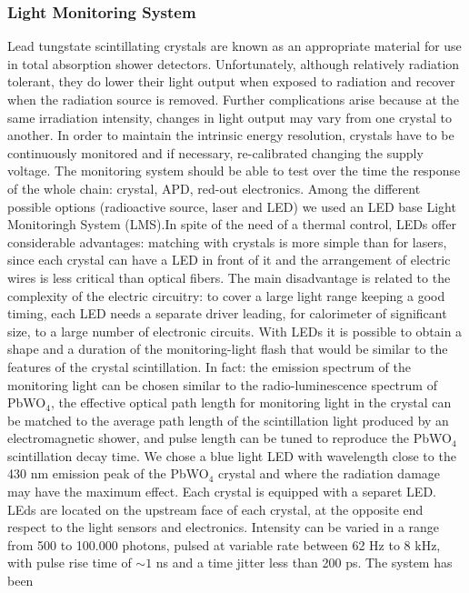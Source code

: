 \subsubsection{Light Monitoring System}
Lead tungstate scintillating crystals are known
as an appropriate material for use in total absorption
shower detectors. Unfortunately, although
relatively radiation tolerant, they do
lower their light output when exposed to radiation
and recover when the radiation source is
removed. Further complications
arise because at the same irradiation intensity, changes in light output may vary from
one crystal to another.
In order to maintain the intrinsic energy resolution, crystals
have to be continuously monitored and
if necessary, re-calibrated changing the supply voltage.
The monitoring system should be able to 
 test over the time  the response of the whole chain: crystal,
APD, red-out electronics.
Among the different possible options (radioactive source, laser and LED) we used an LED base Light Monitoringh System (LMS).In spite of the
need of a thermal control, LEDs offer
considerable advantages: matching with
crystals is more simple than for lasers,
since each crystal can have a LED in
front of it and the arrangement of electric
wires is less critical than optical fibers.
The main disadvantage is related to the
complexity of the electric circuitry: to
cover a large light range keeping a good
timing, each LED needs a separate driver
leading, for calorimeter of significant size,
to a large number of electronic circuits.
With LEDs it is
possible to obtain a shape and a duration
of the monitoring-light flash that would be
similar to the features of the crystal scintillation.
In fact: the emission spectrum of
the monitoring light can be chosen similar to
the radio-luminescence spectrum of PbWO$_4$,
the effective optical path length for monitoring
light in the crystal can be matched to
the average path length of the scintillation
light produced by an electromagnetic shower,
and pulse length can be tuned to reproduce
the PbWO$_4$ scintillation decay time. We chose a blue light LED with wavelength close to the 430 nm emission
peak of the PbWO$_4$ crystal and where the
radiation damage may have the maximum effect.
Each crystal is equipped with a separet LED.
LEds are located on
the upstream face of each crystal, at the
opposite end respect to the light sensors
and electronics. Intensity can be varied in
a range from 500 to 100.000 photons, pulsed at  variable rate between 62 Hz to 8 kHz, with pulse rise time of $\sim1$ ns and a time jitter less than 200 ps. The system has been 
